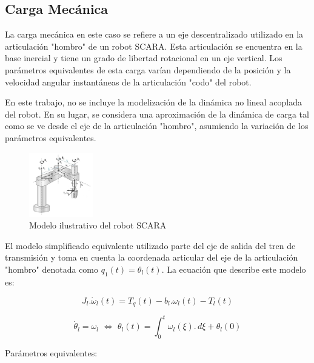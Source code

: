 \documentclass{article}
\begin{document}
\subsection{Carga Mecánica}
    
    La carga mecánica en este caso se refiere a un eje descentralizado utilizado en la articulación "hombro" 
    de un robot SCARA. Esta articulación se encuentra en la base inercial y tiene un grado de libertad 
    rotacional en un eje vertical. Los parámetros equivalentes de esta carga varían dependiendo de la posición 
    y la velocidad angular instantáneas de la articulación "codo" del robot.

    En este trabajo, no se incluye la modelización de la dinámica no lineal acoplada del robot. En su lugar, 
    se considera una aproximación de la dinámica de carga tal como se ve desde el eje de la articulación 
    "hombro", asumiendo la variación de los parámetros equivalentes.

    \begin{figure}[H]
        \centering
        \includegraphics[width=0.25\textwidth]{Alan1.jpg}
        \caption{Modelo ilustrativo del robot SCARA}
    \end{figure}

    El modelo simplificado equivalente utilizado parte del eje de salida del tren de transmisión y toma en 
    cuenta la coordenada articular del eje de la articulación "hombro" denotada como $q_1(t) = θ_l(t)$. La 
    ecuación que describe este modelo es:

    \begin{equation}\label{eq:carga_mecanica1}
        J_{l}.\dot{\omega}_{l}(t) = T_{q}(t)-b_{l}.\omega_{l}(t)-T_{l}(t)
    \end{equation}

    \begin{equation}\label{eq:carga_mecanica2}
        \dot{\theta}_{l} = \omega_{l} \,\, \Leftrightarrow \,\, \theta_{l}(t) = \int_{0}^{t} \omega_{l}(\xi). \,d\xi + \theta_{l}(0)
    \end{equation}

    \noindent Parámetros equivalentes:\\
\end{document}
